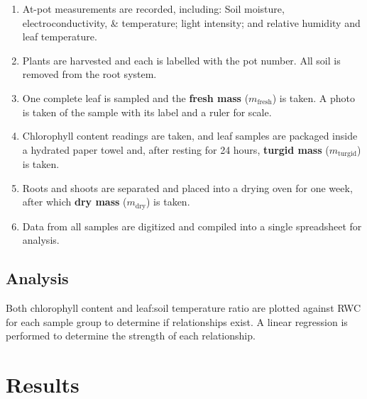\documentclass{report}
\begin{document}
\begin{enumerate}
    \item At-pot measurements are recorded, including: Soil moisture, electroconductivity, \& temperature; light intensity; and relative humidity and leaf temperature.
    \item Plants are harvested and each is labelled with the pot number. All soil is removed from the root system.
    \item One complete leaf is sampled and the \textbf{fresh mass} ($m_{\text{fresh}}$) is taken. A photo is taken of the sample with its label and a ruler for scale.
    \item Chlorophyll content readings are taken, and leaf samples are packaged inside a hydrated paper towel and, after resting for 24 hours, \textbf{turgid mass} ($m_{\text{turgid}}$) is taken.
    \item Roots and shoots are separated and placed into a drying oven for one week, after which \textbf{dry mass} ($m_{\text{dry}}$) is taken.
    \item Data from all samples are digitized and compiled into a single spreadsheet for analysis.
\end{enumerate}

\subsection{Analysis}

\hspace{24pt}Both chlorophyll content and leaf:soil temperature ratio are plotted against RWC for each sample group to determine if relationships exist. A linear regression is performed to determine the strength of each relationship.

\clearpage

\section{Results}

\end{document}
